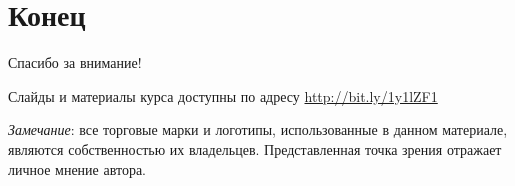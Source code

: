 \documentclass{beamer}
\begin{document}

	



\section{Конец}
\begin{frame}

{\huge{Спасибо за внимание!}\par}

\vfill

Слайды и материалы курса доступны по адресу \url{http://bit.ly/1y1lZF1} %

\vfill

\tiny{\textit{Замечание}: все торговые марки и логотипы, использованные в данном материале, являются собственностью их владельцев. Представленная точка зрения отражает личное мнение автора.
}

\end{frame}

\end{document}

